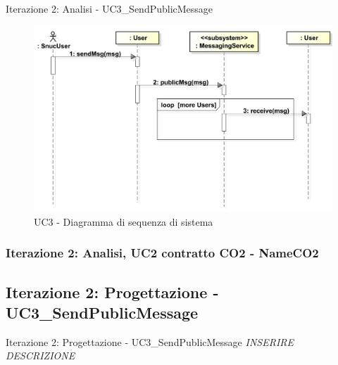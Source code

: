 \documentclass[t]{beamer} %
\begin{document}
\begin{frame} {Iterazione 2: Analisi - UC3\_SendPublicMessage}
   \begin{figure}
     \includegraphics[scale=0.33]{image_astah/Iteration_2_DomainModel/UC3_SendPublicMessage_SSD.png}{\centering}
     \caption{UC3 - Diagramma di sequenza di sistema}
     \label{fig_UC3_SPM_SSD} 
   \end{figure}
\end{frame}

\begin{frame}
 \frametitle{Iterazione 2: Analisi, UC2 contratto CO2 - NameCO2}
  \begin{table}[!htbp]
   \caption {UC2 Contratto CO2 - NameCO2}
    \label{table:1}
   \end{table}
\end{frame}

\subsection{Iterazione 2: Progettazione - UC3\_SendPublicMessage}
\begin{frame} {Iterazione 2: Progettazione - UC3\_SendPublicMessage}
  \emph{INSERIRE DESCRIZIONE}
\end{frame}
\end{document}
